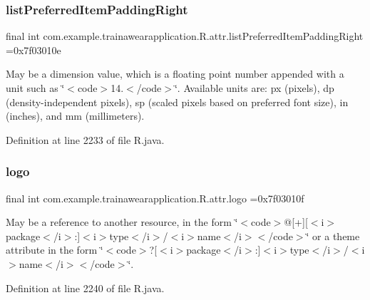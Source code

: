 \subsubsection{\texorpdfstring{listPreferredItemPaddingRight}{listPreferredItemPaddingRight}}
{\footnotesize\ttfamily final int com.\+example.\+trainawearapplication.\+R.\+attr.\+list\+Preferred\+Item\+Padding\+Right =0x7f03010e\hspace{0.3cm}{\ttfamily [static]}}

May be a dimension value, which is a floating point number appended with a unit such as \char`\"{}$<$code$>$14.\+5sp$<$/code$>$\char`\"{}. Available units are\+: px (pixels), dp (density-\/independent pixels), sp (scaled pixels based on preferred font size), in (inches), and mm (millimeters). 

Definition at line 2233 of file R.\+java.

\mbox{\label{classcom_1_1example_1_1trainawearapplication_1_1_r_1_1attr_a9f9dca4b8651ad25f8ee810f810b7188}} 
\subsubsection{\texorpdfstring{logo}{logo}}
{\footnotesize\ttfamily final int com.\+example.\+trainawearapplication.\+R.\+attr.\+logo =0x7f03010f\hspace{0.3cm}{\ttfamily [static]}}

May be a reference to another resource, in the form \char`\"{}$<$code$>$@\mbox{[}+\mbox{]}\mbox{[}$<$i$>$package$<$/i$>$\+:\mbox{]}$<$i$>$type$<$/i$>$/$<$i$>$name$<$/i$>$$<$/code$>$\char`\"{} or a theme attribute in the form \char`\"{}$<$code$>$?\mbox{[}$<$i$>$package$<$/i$>$\+:\mbox{]}$<$i$>$type$<$/i$>$/$<$i$>$name$<$/i$>$$<$/code$>$\char`\"{}. 

Definition at line 2240 of file R.\+java.

\mbox{\label{classcom_1_1example_1_1trainawearapplication_1_1_r_1_1attr_a5cea25ad96a18b31dfc7356967538d3f}} 
